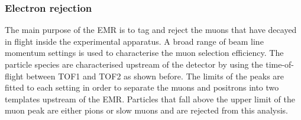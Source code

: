\subsubsection{Electron rejection}
The main purpose of the EMR is to tag and reject the muons that have decayed in flight inside the experimental apparatus. A broad range of beam line momentum settings
is used to characterise the muon selection efficiency. The particle species are characterised upstream of the detector by using the time-of-flight between TOF1 and TOF2 as shown before.
The limits of the peaks are fitted to each setting in order to separate the muons and positrons into two templates upstream of the EMR. Particles that fall above the upper limit of the muon peak are either pions or slow muons and are rejected from this analysis.

